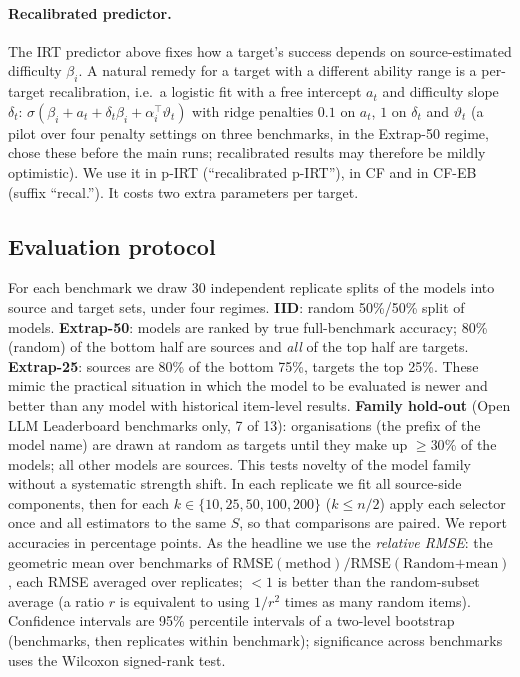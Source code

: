 \paragraph{Recalibrated predictor.}
The IRT predictor above fixes how a target's success depends on source-estimated difficulty $\beta_i$. A natural remedy for a target with a different ability range is a per-target recalibration, i.e.\ a logistic fit with a free intercept $a_t$ and difficulty slope $\delta_t$: $\sigma(\beta_i+a_t+\delta_t\beta_i+\alpha_i^\top\vartheta_t)$ with ridge penalties $0.1$ on $a_t$, $1$ on $\delta_t$ and $\vartheta_t$ (a pilot over four penalty settings on three benchmarks, in the Extrap-50 regime, chose these before the main runs; recalibrated results may therefore be mildly optimistic). We use it in p-IRT (``recalibrated p-IRT''), in CF and in CF-EB (suffix ``recal.''). It costs two extra parameters per target.

\subsection{Evaluation protocol}
\label{sec:protocol}
For each benchmark we draw 30 independent replicate splits of the models into source and target sets, under four regimes.
\textbf{IID}: random 50\%/50\% split of models.
\textbf{Extrap-50}: models are ranked by true full-benchmark accuracy; 80\% (random) of the bottom half are sources and \emph{all} of the top half are targets.
\textbf{Extrap-25}: sources are 80\% of the bottom 75\%, targets the top 25\%.
These mimic the practical situation in which the model to be evaluated is newer and better than any model with historical item-level results.
\textbf{Family hold-out} (Open LLM Leaderboard benchmarks only, 7 of 13): organisations (the prefix of the model name) are drawn at random as targets until they make up $\ge30\%$ of the models; all other models are sources. This tests novelty of the model family without a systematic strength shift.
In each replicate we fit all source-side components, then for each $k\in\{10,25,50,100,200\}$ ($k\le n/2$) apply each selector once and all estimators to the same $S$, so that comparisons are paired.
We report accuracies in percentage points. As the headline we use the \emph{relative RMSE}: the geometric mean over benchmarks of $\text{RMSE}(\text{method})/\text{RMSE}(\text{Random+mean})$, each RMSE averaged over replicates; $<1$ is better than the random-subset average (a ratio $r$ is equivalent to using $1/r^{2}$ times as many random items). Confidence intervals are 95\% percentile intervals of a two-level bootstrap (benchmarks, then replicates within benchmark); significance across benchmarks uses the Wilcoxon signed-rank test.
